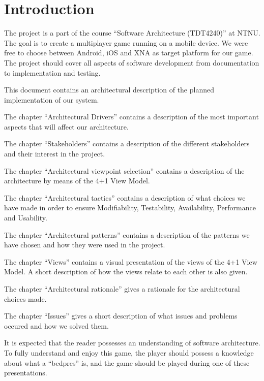\section{Introduction}
\label{sec:introduction}
The project is a part of the course ``Software Architecture (TDT4240)'' at NTNU. The goal is to create a multiplayer game running on a mobile device. We were free to choose between Android, iOS and XNA as target platform for our game. 
The project should cover all aspects of software development from documentation to implementation and testing. 

This document contains an architectural description of the planned implementation of our system.

The chapter ``Architectural Drivers'' contains a description of the most important aspects that will affect our architecture.

The chapter ``Stakeholders'' contains a description of the different stakeholders and their interest in the project. 

The chapter ``Architectural viewpoint selection'' contains a description of the architecture by means of the 4+1 View Model. 

The chapter ``Architectural tactics'' contains a description of what choices we have made in order to ensure Modifiability, Testability, Availability, Performance and Usability. 

The chapter ``Architectural patterns'' contains a description of the patterns we have chosen and how they were used in the project.

The chapter ``Views'' contains a visual presentation of the views of the 4+1 View Model. A short description of how the views relate to each other is also given.

The chapter ``Architectural rationale'' gives a rationale for the architectural choices made.

The chapter ``Issues'' gives a short description of what issues and problems occured and how we solved them.

It is expected that the reader possesses an understanding of software
architecture. To fully understand and enjoy this game, the player should
possess a knowledge about what a ``bedpres'' is, and the game should be played
during one of these presentations.
